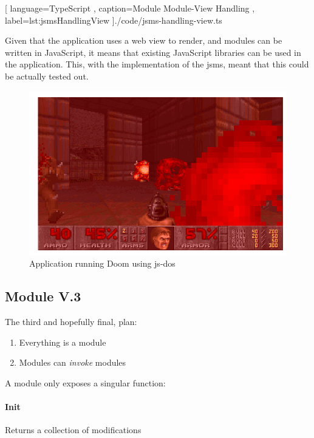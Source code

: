 \begin{center}
  
    [ language=TypeScript
    , caption={Module Module-View Handling}
    , label=lst:jsmsHandlingView
    ]{./code/jsms-handling-view.ts}
\end{center}

Given that the application uses a web view to render, and modules can be written
in JavaScript, it means that existing JavaScript libraries can be used in the
application. This, with the implementation of the \gls{jsms}, meant that this
could be actually tested out.


\begin{figure}
  \centering
  \includegraphics[scale=0.5]{./pics/doom}
  \caption{Application running Doom using js-dos}
  \label{fig:doom}
\end{figure}

\subsection{Module V.3}

The third and hopefully final, plan:

\begin{enumerate}
  \item Everything is a module
  \item Modules can \textit{invoke} modules
\end{enumerate}

A module only exposes a singular function:

\paragraph{Init} Returns a collection of modifications


